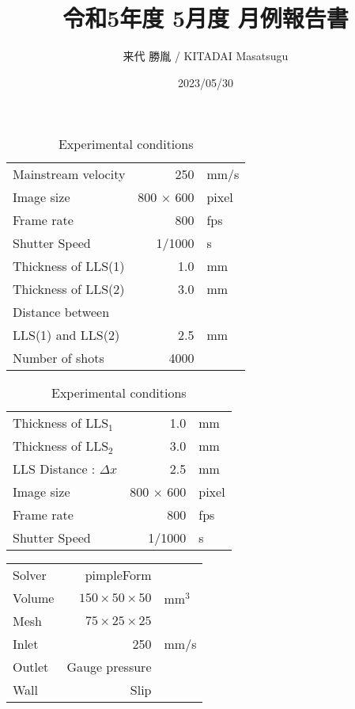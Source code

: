 \documentclass[a4j]{jsarticle}
\author{来代 勝胤 / KITADAI Masatsugu}
\title{令和5年度 5月度 月例報告書}
\date{2023/05/30}
\begin{document}
\columnseprule=0.1mm
\maketitle

\begin{table}[h]
  \label{table:data_type}
  \centering
  \caption{Experimental conditions}
  \begin{tabular}{l r l}
    \hline
    Mainstream velocity & 250              & mm/s  \\
    Image size          & 800 $\times$ 600 & pixel \\
    Frame rate          & 800              & fps   \\
    Shutter Speed       & 1/1000           & s     \\
    Thickness of LLS(1) & 1.0              & mm    \\
    Thickness of LLS(2) & 3.0              & mm    \\
    Distance between                               \\
    LLS(1) and LLS(2)   & 2.5              & mm    \\
    Number of shots     & 4000             &       \\ \hline
  \end{tabular}
\end{table}

\begin{table}[h]
  \label{table:data_type}
  \centering
  \caption{Experimental conditions}
  \begin{tabular}{l r l}
    \hline
    Thickness of LLS$_1$      & 1.0              & mm    \\
    Thickness of LLS$_2$      & 3.0              & mm    \\
    LLS Distance : $\Delta x$ & 2.5              & mm    \\ \hline
    Image size                & 800 $\times$ 600 & pixel \\
    Frame rate                & 800              & fps   \\
    Shutter Speed             & 1/1000           & s     \\ \hline
  \end{tabular}
\end{table}

\begin{table}[h]
  \label{table:data_type}
  \centering
  \begin{tabular}{l r l}
    \hline
    Solver & pimpleForm                &                 \\
    Volume & $150 \times 50 \times 50$ & $\mathrm{mm}^3$ \\
    Mesh   & $75 \times 25 \times 25$  &                 \\
    Inlet  & 250                       & mm/s            \\
    Outlet & Gauge pressure            &                 \\
    Wall   & Slip                      &                 \\\hline
  \end{tabular}
\end{table}
\end{document}
